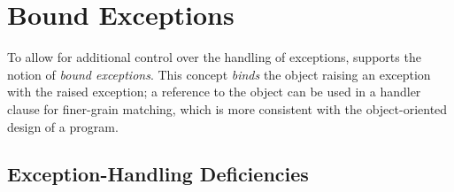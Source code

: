 \documentclass[openright,twoside]{report}
\begin{document}
\begin{comment}
Therefore, precluding exception objects from being \LGinlinetrue\LGbegin\lgrinde\L{\LB{\K{const}}}\endlgrinde\LGend{} does not appear to cause significant programming problems at the raise site because exceptions are largely local and temporary, nor does it cause problems at the catch site with respect to matching or the way the exception object is used.
But most importantly, this restriction precludes conceptual mistakes by programmers that create a \LGinlinetrue\LGbegin\lgrinde\L{\LB{\K{const}}}\endlgrinde\LGend{} exception only to have a non-\LGinlinetrue\LGbegin\lgrinde\L{\LB{\K{const}}}\endlgrinde\LGend{} copy created (in many cases) and then mistakenly believe the \LGinlinetrue\LGbegin\lgrinde\L{\LB{\K{const}}}\endlgrinde\LGend{} property is useful in handler matching, or that perform a local resumption and wonder why the non-\LGinlinetrue\LGbegin\lgrinde\L{\LB{\K{const}}}\endlgrinde\LGend{} handler does not match but does match for non-local resumption with the same exception.
\end{comment}


\section{Bound Exceptions}
\label{s:BoundExceptions}

To allow for additional control over the handling of exceptions, \uC supports the notion of \emph{bound exceptions}. 
This concept \emph{binds} the object raising an exception with the raised exception;
a reference to the object can be used in a handler clause for finer-grain matching, which is more consistent with the object-oriented design of a program.


\subsection{\texorpdfstring{\CC Exception-Handling Deficiencies}{C++ Exception-Handling Deficiencies}}
\end{document}
